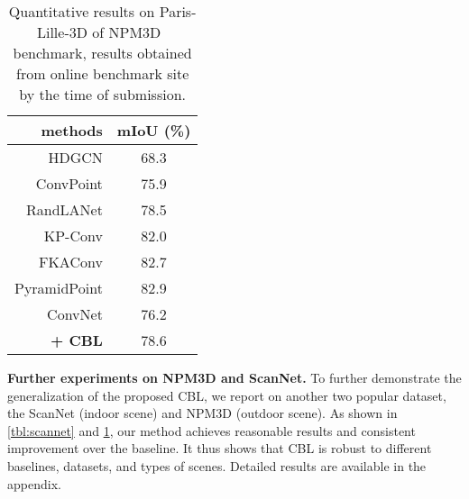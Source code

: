 \documentclass[10pt,twocolumn,letterpaper]{article}
\begin{document}
\begin{table}
\begin{center}

\begin{tabular}{r |c}
\hline
  methods  & mIoU (\%) \\
\hline
HDGCN\cite{hdgcn}	            & 68.3 \\
ConvPoint\cite{convpoints}	    & 75.9 \\
RandLANet\cite{randlanet}	    & 78.5 \\
KP-Conv\cite{kpconv}	        & 82.0 \\
FKAConv\cite{fkaconv}	        & 82.7 \\
PyramidPoint\cite{pyramidpoint} & 82.9 \\
\hline
ConvNet                 & 76.2 \\
\textbf{ + CBL}  & 78.6 \\
\hline
\end{tabular}

\end{center}
\caption{Quantitative results on Paris-Lille-3D of NPM3D~\cite{npm3d} benchmark, results obtained from online benchmark site by the time of submission.
}
\label{tbl:npm3d}
\end{table}

\noindent\textbf{Further experiments on NPM3D and ScanNet.}
To further demonstrate the generalization of the proposed CBL, we report on another two popular dataset, the ScanNet\cite{scannet} (indoor scene) and NPM3D\cite{npm3d} (outdoor scene). As shown in \cref{tbl:scannet} and \cref{tbl:npm3d}, our method achieves reasonable results and consistent improvement over the baseline. It thus shows that CBL is robust to different baselines, datasets, and types of scenes. Detailed results are available in the appendix.
\end{document}
